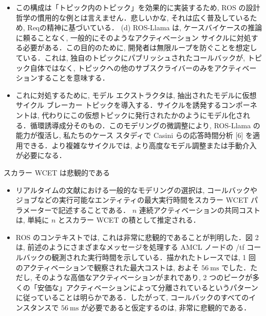 \begin{frame}{}
    \begin{itemize}
        \item この構成は「トピック内のトピック」を効果的に実装するため, ROS の設計哲学の慣用的な例とは言えません．悲しいかな, それは広く普及しているため, Reqの精神に基づいている． (d) ROS-Llama は, ケースバイケースの推論に頼ることなく, 一般的にそのようなアクティベーション サイクルに対処する必要がある．この目的のために, 開発者は無限ループを防ぐことを想定している．これは, 独自のトピックにパブリッシュされたコールバックが, トピック自体ではなく, トピックへの他のサブスクライバーのみをアクティベーションすることを意味する．
    \end{itemize}
\end{frame}

\begin{frame}{}
    \begin{itemize}
        \item これに対処するために, モデル エクストラクタは, 抽出されたモデルに仮想サイクル ブレーカー トピックを導入する．サイクルを誘発するコンポーネントは, 代わりにこの仮想トピックに発行されたかのようにモデル化される．循環誘導成分そのもの．このモデリングの微調整により, ROS-Llama の能力が復活し, 私たちのケース スタディで Casini らの応答時間分析 [6] を適用できる．より複雑なサイクルでは, より高度なモデル調整または手動介入が必要になる．
    \end{itemize}
\end{frame}

\begin{frame}{スカラー WCET は悲観的である}
    \begin{itemize}
        \item リアルタイムの文献における一般的なモデリングの選択は, コールバックやジョブなどの実行可能なエンティティの最大実行時間をスカラー WCET パラメーターで記述することである． $n$ 連続アクティベーションの共同コストは, 単純に $n$ とスカラー WCET の積として推定される．
    \end{itemize}
\end{frame}

\begin{frame}{}
    \begin{itemize}
        \item ROS のコンテキストでは, これは非常に悲観的であることが判明した．図 2 は, 前述のようにさまざまなメッセージを処理する AMCL ノードの /tf コールバックの観測された実行時間を示している．描かれたトレースでは, 1 回のアクティベーションで観察された最大コストは, およそ $56 \mathrm{~ms}$ でした．ただし, そのような高価なアクティベーションがまれであり, 2 つのピークが多くの「安価な」アクティベーションによって分離されているというパターンに従っていることは明らかである．したがって, コールバックのすべてのインスタンスで $56 \mathrm{~ms}$ が必要であると仮定するのは, 非常に悲観的である．
    \end{itemize}
\end{frame}


